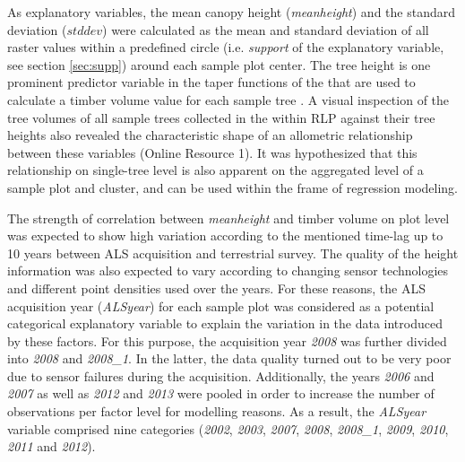 As explanatory variables, the mean canopy height (\textit{meanheight}) and the standard deviation ($stddev$) were calculated as the mean and standard deviation of all raster values within a predefined circle (i.e. \textit{support} of the explanatory variable, see section \ref{sec:supp}) around each sample plot center.  The tree height is one prominent predictor variable in the taper functions of the \bwi{} that are used to calculate a timber volume value for each sample tree \citep{kublin2003, kublin2013}. A visual inspection of the tree volumes of all sample trees collected in the \bwi{} within RLP against their tree heights also revealed the characteristic shape of an allometric relationship between these variables (Online Resource 1). It was hypothesized that this relationship on single-tree level is also apparent on the aggregated level of a sample plot and cluster, and can be used within the frame of regression modeling.\par
The strength of correlation between \textit{meanheight} and timber volume on plot level was expected to show high variation according to the mentioned time-lag up to 10 years between ALS acquisition and terrestrial survey. The quality of the height information was also expected to vary according to changing sensor technologies and different point densities used over the years. For these reasons, the ALS acquisition year (\textit{ALSyear}) for each sample plot was considered as a potential categorical explanatory variable to explain the variation in the data introduced by these factors. For this purpose, the acquisition year \textit{2008} was further divided into \textit{2008} and \textit{2008\_1}. In the latter, the data quality turned out to be very poor due to sensor failures during the acquisition. Additionally, the years \textit{2006} and \textit{2007} as well as \textit{2012} and \textit{2013} were pooled in order to increase the number of observations per factor level for modelling reasons. As a result, the \textit{ALSyear} variable comprised nine categories (\textit{2002}, \textit{2003}, \textit{2007}, \textit{2008}, \textit{2008\_1}, \textit{2009}, \textit{2010}, \textit{2011} and \textit{2012}).


